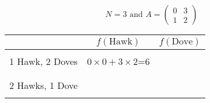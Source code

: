 \documentclass{article}
\begin{document}
\section*{}
\subsection*{}


\[
N=3 
\text{ and } 
A = 
\begin{pmatrix}
    0 & 3 \\ 
    1 & 2
\end{pmatrix}
\]

\vspace{1cm}

\begin{center}
    \begin{tabular}{r|c|c}
        \toprule
                         & \(f(\text{Hawk})\)           & \(f(\text{Dove})\) \\
        \midrule
                         &                              & \\
        1 Hawk, 2 Doves  & \(0\times 0  + 3\times 2\)=6 & \phantom{\(0\times 0 + 3\times 2\)=6} \\
                         &                              & \\
        \midrule
                         &                              & \\
        2 Hawks, 1 Dove  &                              & \\
                         &                              & \\
        \bottomrule
    \end{tabular}
\end{center}

\subsection*{}
\end{document}
